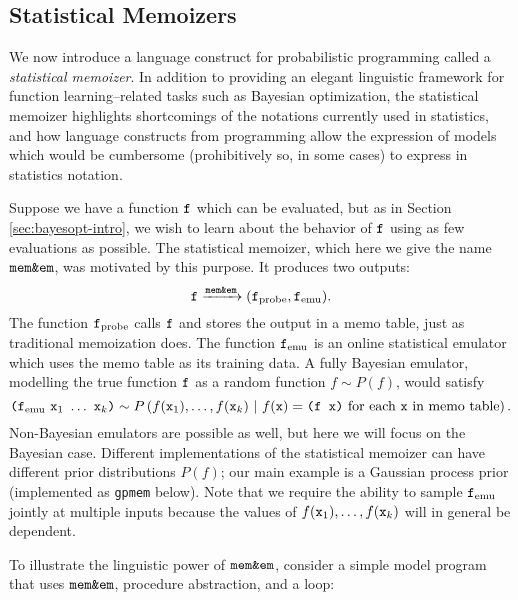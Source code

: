 \subsection{Statistical Memoizers}
We now introduce a language construct for probabilistic programming called a
\emph{statistical memoizer}.  In addition to providing an elegant linguistic
framework for function learning--related tasks such as Bayesian optimization,
the statistical memoizer highlights shortcomings of the notations currently used
in statistics, and how language constructs from programming allow the expression
of models which would be cumbersome (prohibitively so, in some cases) to express
in statistics notation.

Suppose we have a function $\texttt{f}$ which can be evaluated, but as in Section
\ref{sec:bayesopt-intro}, we wish to learn about the behavior of $\texttt{f}$ using as
few evaluations as possible.  The statistical memoizer, which here we give the
name $\texttt{mem\&em}$, was motivated by this purpose.  It produces two outputs:
\[ \texttt{f} \xrightarrow{\texttt{mem\&em}} (\texttt{f}_{\textrm{probe}}, \texttt{f}_{\textrm{emu}}). \]
The function $\texttt{f}_{\textrm{probe}}$ calls $\texttt{f}$ and stores the output in a memo
table, just as traditional memoization does.  The function $\texttt{f}_{\textrm{emu}}$ is
an online statistical emulator which uses the memo table as its training
data.  A fully Bayesian emulator, modelling the true function $\texttt{f}$ as a
random function $f \sim P(f)$, would satisfy
\[
\texttt{(}\ftt_\emu\ \xtt_1\ \ldots\ \xtt_k\texttt{)}
\sim
P\pn{
  f(\xtt_1), \ldots, f(\xtt_k)
  \mvert
  \text{$f(\xtt) = \texttt{(f x)}$ for each $\xtt$ in memo table}
}.
\]
Non-Bayesian emulators are possible as well, but here we will focus on the
Bayesian case.  Different implementations of the statistical memoizer can have
different prior distributions $P(f)$; our main example is a Gaussian process
prior (implemented as \texttt{gpmem} below).  Note that we require the ability
to sample $\texttt{f}_{\textrm{emu}}$ jointly at multiple inputs because the values of
$f(\texttt{x}_1),\ldots,f(\texttt{x}_k)$ will in general be dependent.

To illustrate the linguistic power of $\texttt{mem\&em}$, consider a simple model program
that uses $\texttt{mem\&em}$, procedure abstraction, and a loop:

